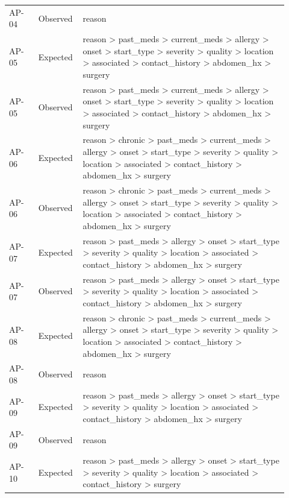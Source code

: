 \begin{longtable}{>{\raggedright\arraybackslash}p{0.1\linewidth}>{\raggedright\arraybackslash}p{0.12\linewidth}>{\raggedright\arraybackslash}p{0.7\linewidth}}
AP-\allowbreak{}04 & Observed & reason \\
AP-\allowbreak{}05 & Expected & reason > past\_\allowbreak{}meds > current\_\allowbreak{}meds > allergy > onset > start\_\allowbreak{}type > severity > quality > location > associated > contact\_\allowbreak{}history > abdomen\_\allowbreak{}hx > surgery \\
AP-\allowbreak{}05 & Observed & reason > past\_\allowbreak{}meds > current\_\allowbreak{}meds > allergy > onset > start\_\allowbreak{}type > severity > quality > location > associated > contact\_\allowbreak{}history > abdomen\_\allowbreak{}hx > surgery \\
AP-\allowbreak{}06 & Expected & reason > chronic > past\_\allowbreak{}meds > current\_\allowbreak{}meds > allergy > onset > start\_\allowbreak{}type > severity > quality > location > associated > contact\_\allowbreak{}history > abdomen\_\allowbreak{}hx > surgery \\
AP-\allowbreak{}06 & Observed & reason > chronic > past\_\allowbreak{}meds > current\_\allowbreak{}meds > allergy > onset > start\_\allowbreak{}type > severity > quality > location > associated > contact\_\allowbreak{}history > abdomen\_\allowbreak{}hx > surgery \\
AP-\allowbreak{}07 & Expected & reason > past\_\allowbreak{}meds > allergy > onset > start\_\allowbreak{}type > severity > quality > location > associated > contact\_\allowbreak{}history > abdomen\_\allowbreak{}hx > surgery \\
AP-\allowbreak{}07 & Observed & reason > past\_\allowbreak{}meds > allergy > onset > start\_\allowbreak{}type > severity > quality > location > associated > contact\_\allowbreak{}history > abdomen\_\allowbreak{}hx > surgery \\
AP-\allowbreak{}08 & Expected & reason > chronic > past\_\allowbreak{}meds > current\_\allowbreak{}meds > allergy > onset > start\_\allowbreak{}type > severity > quality > location > associated > contact\_\allowbreak{}history > abdomen\_\allowbreak{}hx > surgery \\
AP-\allowbreak{}08 & Observed & reason \\
AP-\allowbreak{}09 & Expected & reason > past\_\allowbreak{}meds > allergy > onset > start\_\allowbreak{}type > severity > quality > location > associated > contact\_\allowbreak{}history > abdomen\_\allowbreak{}hx > surgery \\
AP-\allowbreak{}09 & Observed & reason \\
AP-\allowbreak{}10 & Expected & reason > past\_\allowbreak{}meds > allergy > onset > start\_\allowbreak{}type > severity > quality > location > associated > contact\_\allowbreak{}history > surgery \\

\end{longtable}
